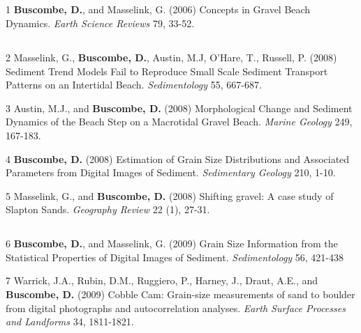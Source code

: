 \documentclass[margin,line]{resume}
\begin{document}
\begin{resume}
	\subsection{}
        \begin{footnotesize}
	\begin{list1}
	\item[1] {\bf Buscombe, D.}, and Masselink, G. (2006) Concepts in Gravel Beach Dynamics. {\sl Earth Science Reviews} 79, 33-52.
	\end{list1}
	
	\subsection{}
	\begin{list1}
	\item[2] Masselink, G., {\bf Buscombe, D.}, Austin, M.J, O'Hare, T., Russell, P. (2008) Sediment Trend Models Fail to Reproduce Small Scale Sediment Transport Patterns on an Intertidal Beach. {\sl Sedimentology} 55, 667-687.\\
	
	\item[3] Austin, M.J., and {\bf Buscombe, D.} (2008) Morphological Change and Sediment Dynamics of the Beach Step on a Macrotidal Gravel Beach. {\sl Marine Geology} 249, 167-183. \\
	
	\item[4] {\bf Buscombe, D.} (2008) Estimation of Grain Size Distributions and Associated Parameters from Digital Images of Sediment. {\sl Sedimentary Geology}  210, 1-10.\\

	\item[5] Masselink, G., and {\bf Buscombe, D.} (2008) Shifting gravel: A case study of Slapton Sands. {\sl Geography Review} 22 (1), 27-31.
	\end{list1}

	\subsection{}
	\begin{list1}
	\item[6] {\bf Buscombe, D.}, and Masselink, G. (2009) Grain Size Information from the Statistical Properties of Digital Images of Sediment. {\sl Sedimentology} 56, 421-438 \\

	\item[7] Warrick, J.A., Rubin, D.M., Ruggiero, P., Harney, J., Draut, A.E., and {\bf Buscombe, D.} (2009) Cobble Cam: Grain-size measurements of sand to boulder from digital photographs and autocorrelation analyses. {\sl Earth Surface Processes and Landforms} 34, 1811-1821.\\


\end{list1}
\end{footnotesize}
\end{resume}
\end{document}

